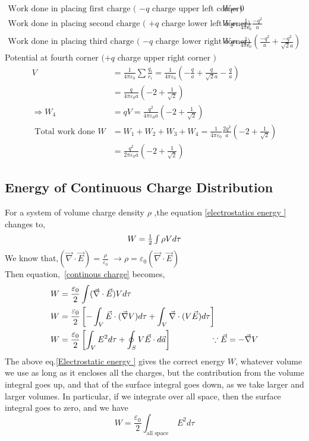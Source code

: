 \begin{answer}
	\begin{align*}
	\text{Work done in placing first charge ( $-q$ charge upper left corner) }W_{1}&=0\\
	\text{Work done in placing second charge ( $+q$ charge lower left corner)} W_{2}&=\frac{1}{4\pi \epsilon_{0}}\frac{-q^{2}}{a}\\
	\text{Work done in placing third charge ( $-q$ charge lower right corner)} W_{3}&=\frac{1}{4\pi \epsilon_{0}}\left( \frac{-q^{2}}{a}+\frac{-q^{2}}{\sqrt{2}a} \right) 
	\end{align*}
	Potential at fourth corner $(+q$ charge upper right corner $)$
	\begin{align*}
	V&=\frac{1}{4 \pi \varepsilon_{0}} \sum \frac{q_{i}}{r_{i}}=\frac{1}{4 \pi \varepsilon_{0}}\left(-\frac{q}{a}+\frac{q}{\sqrt{2} a}-\frac{q}{a}\right)\\&=\frac{q}{4 \pi \varepsilon_{0} a}\left(-2+\frac{1}{\sqrt{2}}\right) \\
	\Rightarrow W_{4}&=q V=\frac{q^{2}}{4 \pi \varepsilon_{0} a}\left(-2+\frac{1}{\sqrt{2}}\right) \\
	\text { Total work done }W&=W_{1}+W_{2}+W_{3}+W_{4}=\frac{1}{4 \pi \varepsilon_{0}} \frac{2 q^{2}}{a}\left(-2+\frac{1}{\sqrt{2}}\right)\\&=\frac{q^{2}}{2 \pi \varepsilon_{0} a}\left(-2+\frac{1}{\sqrt{2}}\right)
	\end{align*}
\end{answer}
\subsection{Energy of Continuous Charge Distribution}
For a system of volume charge density $\rho$ ,the equation \ref{electrostatics energy
} changes to,
\begin{equation}
$$W=\frac{1}{2} \int \rho V d \tau$$\label{continous charge}
\end{equation}
We know that,$(\vec{\nabla} \cdot \vec{E})=\frac{\rho}{\varepsilon_{0}}$
$\rightarrow$$\rho=\varepsilon_{0}(\vec{\nabla} \cdot \vec{E}) $ \\Then equation,\ \ref{continous charge} becomes,
\begin{align}
W&=\frac{\varepsilon_{0}}{2} \int(\vec{\nabla} \cdot \vec{E}) V d \tau\notag \\ W&=\frac{\varepsilon_{0}}{2}\left[-\int_{V} \vec{E} \cdot(\vec{\nabla} V) d \tau+\int_{V} \vec{\nabla} \cdot(V \vec{E}) d \tau\right]\notag\\
W&=\frac{\varepsilon_{0}}{2}\left[\int_{V} E^{2} d \tau+\oint_{S} V \vec{E} \cdot d \vec{a}\right] \hspace{1cm}\qquad\because\vec{E}=-\vec{\nabla} V \label{Electrostatic energy }
\end{align}
The above eq.\ref{Electrostatic energy } gives the correct energy $W$, whatever volume we use as long as it
encloses all the charges, but the contribution from the volume integral goes up, and that of
the surface integral goes down, as we take larger and larger volumes. In particular, if we
integrate over all space, then the surface integral goes to zero, and we have
$$
W=\frac{\varepsilon_{0}}{2} \int_{\text {all space }} E^{2} d \tau
$$
